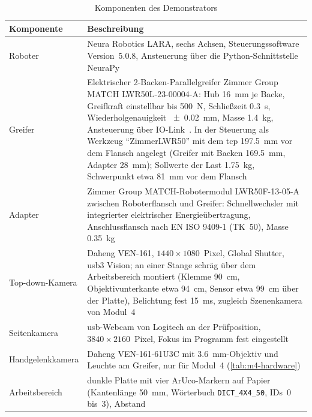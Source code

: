 \begin{table}[htbp]
  \centering
  \caption{Komponenten des Demonstrators}
  \label{tab:hardware}
  \begin{tabularx}{\textwidth}{@{}lX@{}}
    \toprule
    Komponente & Beschreibung \\
    \midrule
    Roboter & Neura Robotics LARA, sechs Achsen, Steuerungssoftware Version~5.0.8,
              Ansteuerung über die Python-Schnittstelle NeuraPy~\cite{neura2025neurapy} \\
    Greifer & Elektrischer 2-Backen-Parallelgreifer Zimmer Group MATCH LWR50L-23-00004-A:
              Hub \SI{16}{\milli\metre} je Backe, Greifkraft einstellbar bis \SI{500}{\newton},
              Schließzeit \SI{0,3}{\second}, Wiederholgenauigkeit \SI{\pm 0,02}{\milli\metre},
              Masse \SI{1,4}{\kilo\gram}, Ansteuerung über IO-Link~\cite{zimmer_lwr50l}.
              In der Steuerung als Werkzeug \enquote{ZimmerLWR50} mit dem \ac{tcp}
              \SI{197,5}{\milli\metre} vor dem Flansch angelegt (Greifer mit Backen
              \SI{169,5}{\milli\metre}, Adapter \SI{28}{\milli\metre}); Sollwerte der Last
              \SI{1,75}{\kilo\gram}, Schwerpunkt etwa \SI{81}{\milli\metre} vor dem Flansch \\
    Adapter & Zimmer Group MATCH-Robotermodul LWR50F-13-05-A zwischen Roboterflansch und
              Greifer: Schnellwechsler mit integrierter elektrischer Energieübertragung,
              Anschlussflansch nach EN ISO 9409-1 (TK~50), Masse
              \SI{0,35}{\kilo\gram}~\cite{zimmer_lwr50f} \\
    Top-down-Kamera & Daheng VEN-161, $1440 \times 1080$~Pixel, Global Shutter,
              \ac{usb}3 Vision; an einer Stange schräg über dem Arbeitsbereich montiert
              (Klemme \SI{90}{\centi\metre}, Objektivunterkante etwa \SI{94}{\centi\metre},
              Sensor etwa \SI{99}{\centi\metre} über der Platte), Belichtung fest
              \SI{15}{\milli\second}, zugleich Szenenkamera von Modul~4 \\
    Seitenkamera & \ac{usb}-Webcam von Logitech an der Prüfposition, $3840 \times 2160$~Pixel,
              Fokus im Programm fest eingestellt \\
    Handgelenkkamera & Daheng VEN-161-61U3C mit \SI{3.6}{\milli\metre}-Objektiv und Leuchte am Greifer, nur für
              Modul~4 (\cref{tab:m4-hardware}) \\
    Arbeitsbereich & dunkle Platte mit vier ArUco-Markern auf Papier (Kantenlänge
              \SI{50}{\milli\metre}, Wörterbuch \texttt{DICT\_4X4\_50}, IDs~0 bis~3), Abstand

\end{tabularx}
\end{table}
